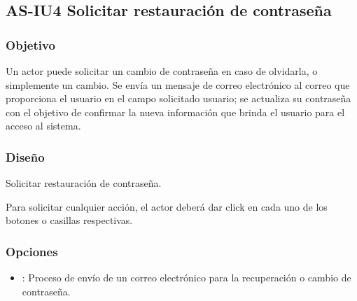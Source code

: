 %

\subsection{AS-IU4 Solicitar restauración de contraseña}

\subsubsection{Objetivo}
	Un actor  puede solicitar un cambio de contraseña en 
	caso de olvidarla, o simplemente un cambio. Se envía un mensaje de 
	correo electrónico al correo que proporciona el usuario en el campo 
	solicitado usuario; se actualiza su contraseña con el objetivo de 
	confirmar la nueva información que brinda el usuario para el acceso al 
	sistema.

\subsubsection{Diseño}

{Solicitar restauración de contraseña.} 

	Para solicitar cualquier acción, el actor deberá dar click en cada uno 
de los botones o casillas respectivas.

\subsubsection{Opciones}
\begin{itemize}
	\item {}: Proceso de envío de un correo 
	electrónico para la recuperación o cambio de contraseña.
\end{itemize}
